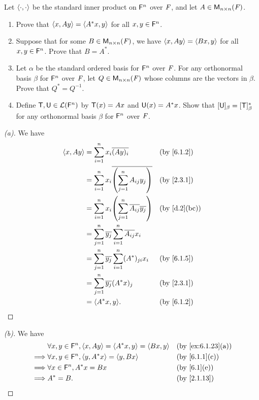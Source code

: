 \begin{ex}\label{ex:6.1.23}
	Let \(\left\langle\cdot, \cdot\right\rangle\) be the standard inner product on \(\mathsf{F}^n\) over \(\mathit{F}\), and let \(A \in \mathsf{M}_{{n} \times n}({\mathit{F}})\).
	\begin{enumerate}
		\item Prove that \(\left\langle x, Ay\right\rangle = \left\langle A^* x, y\right\rangle\) for all \(x, y \in \mathsf{F}^n\).
		\item Suppose that for some \(B \in \mathsf{M}_{{n} \times n}({\mathit{F}})\), we have \(\left\langle x, Ay\right\rangle = \left\langle Bx, y\right\rangle\) for all \(x, y \in \mathsf{F}^n\).
		      Prove that \(B = A^*\).
		\item Let \(\alpha\) be the standard ordered basis for \(\mathsf{F}^n\) over \(\mathit{F}\).
		      For any orthonormal basis \(\beta\) for \(\mathsf{F}^n\) over \(\mathit{F}\), let \(Q \in \mathsf{M}_{{n} \times n}({\mathit{F}})\) whose columns are the vectors in \(\beta\).
		      Prove that \(Q^* = Q^{-1}\).
		\item Define \(\mathsf{T}, \mathsf{U} \in \mathcal{L}(\mathsf{F}^n)\) by \(\mathsf{T}(x) = Ax\) and \(\mathsf{U}(x) = A^* x\).
		      Show that \([\mathsf{U}]_{\beta} = [\mathsf{T}]_{\beta}^*\) for any orthonormal basis \(\beta\) for \(\mathsf{F}^n\) over \(\mathit{F}\).
	\end{enumerate}
\end{ex}

\begin{proof}[(a)]
	We have
	\begin{align*}
		\inn{x, Ay} & = \sum_{i = 1}^n x_i \conj{(Ay)_i}                                 &  & \by{6.1.2}   \\
		            & = \sum_{i = 1}^n x_i \conj{\pa{\sum_{j = 1}^n A_{i j} y_j}}        &  & \by{2.3.1}   \\
		            & = \sum_{i = 1}^n x_i \pa{\sum_{j = 1}^n \conj{A_{i j}} \conj{y_j}} &  & \by{d.2}[bc] \\
		            & = \sum_{j = 1}^n \conj{y_j} \sum_{i = 1}^n \conj{A_{i j}} x_i                        \\
		            & = \sum_{j = 1}^n \conj{y_j} \sum_{i = 1}^n (A^*)_{j i} x_i         &  & \by{6.1.5}   \\
		            & = \sum_{j = 1}^n \conj{y_j} (A^* x)_j                              &  & \by{2.3.1}   \\
		            & = \inn{A^* x, y}.                                                  &  & \by{6.1.2}
	\end{align*}
\end{proof}

\begin{proof}[(b)]
	We have
	\begin{align*}
		         & \forall x, y \in \vs{F}^n, \inn{x, Ay} = \inn{A^* x, y} = \inn{Bx, y} &  & \by{ex:6.1.23}[a] \\
		\implies & \forall x, y \in \vs{F}^n, \inn{y, A^* x} = \inn{y, Bx}               &  & \by{6.1.1}[c]     \\
		\implies & \forall x \in \vs{F}^n, A^* x = Bx                                    &  & \by{6.1}[e]       \\
		\implies & A^* = B.                                                              &  & \by{2.1.13}
	\end{align*}
\end{proof}

